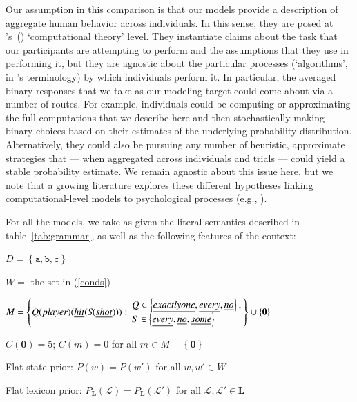 \documentclass[leqno,12pt]{article}
\newcommand{\tabref}[1]{table~\ref{#1}}
\newcommand{\eg}[1]{(\ref{#1})}
\newcommand{\posscitet}[1]{\citeauthor{#1}'s~(\citeyear{#1})}
\newcommand{\word}[1]{\emph{#1}}
\newcommand{\set}[1]{\ensuremath{\left\{ #1 \right\}}}
\newcommand{\Lex}{\mathcal{L}}
\newcommand{\LexSet}{\mathbf{L}}
\newcommand{\Messages}{M}
\newcommand{\msg}{m}
\newcommand{\Costs}{C}
\newcommand{\StatePrior}{P}
\newcommand{\LexPrior}{P_{\LexSet}}
\newcommand{\nullmsg}{\mathbf{0}}
\newcommand{\Worlds}{W}
\newcommand{\Domain}{D}
\newcommand{\playera}{\texttt{a}}
\newcommand{\playerb}{\texttt{b}}
\newcommand{\playerc}{\texttt{c}}
\begin{document}
{Our assumption in this comparison is that our models provide a
description of aggregate human behavior across individuals. In this
sense, they are posed at \posscitet{marr1982} `computational theory'
level. They instantiate claims about the task that our participants
are attempting to perform and the assumptions that they use in
performing it, but they are agnostic about the particular processes
(`algorithms', in \citeauthor{marr1982}'s terminology) by which
individuals perform it. In particular, the averaged binary responses
that we take as our modeling target could come about via a number of
routes. For example, individuals could be computing or approximating
the full computations that we describe here and then stochastically
making binary choices based on their estimates of the underlying
probability distribution. Alternatively, they could also be pursuing
any number of heuristic, approximate strategies that --- when
aggregated across individuals and trials --- could yield a stable
probability estimate. We remain agnostic about this issue here, but we
note that a growing literature explores these different hypotheses
linking computational-level models to psychological processes (e.g.,
\citealt{bonawitz2014,griffiths2014,sanborn2010,vul2014}).

For all the models, we take as given the literal semantics described
in \tabref{tab:grammar}, as well as the following features of the
context:
%
\begin{examples}
\item\label{expmod}
  \begin{examples}
  \item $\Domain = \set{\playera, \playerb, \playerc}$
  \item $\Worlds = $ the set in \eg{conds}
  \item\label{expformulae} $\Messages =
    \setlength{\arraycolsep}{2pt}
    \set{
      Q(\word{player})(\word{hit}(S\negthinspace(\word{shot}))) :
      \begin{array}{l}        
        Q \in \set{\word{exactly one}, \word{every}, \word{no}}, \\
        S \in \set{\word{every}, \word{no}, \word{some}}
      \end{array}} \cup \set{\nullmsg}$
  \item $\Costs(\nullmsg) = 5$; $\Costs(\msg) = 0$ for all $\msg \in \Messages{-}\set{\nullmsg}$  
  \item Flat state prior: $\StatePrior(w) = \StatePrior(w')$ for all $w, w' \in \Worlds$
  \item Flat lexicon prior: $\LexPrior(\Lex) = \LexPrior(\Lex')$ for all $\Lex, \Lex' \in \LexSet$
  \end{examples}
\end{examples}

}
\end{document}

